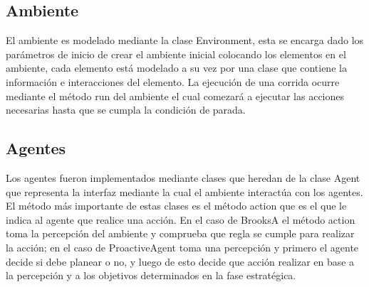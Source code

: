 \documentclass[12pt]{article}
\begin{document}
\subsection{Ambiente}
El ambiente es modelado mediante la clase Environment, esta se encarga dado los par\'ametros de inicio de crear el ambiente 
inicial colocando los elementos en el ambiente, cada elemento est\'a modelado a su vez por una clase que contiene la informaci\'on e interacciones
del elemento. La ejecuci\'on de una corrida ocurre mediante el m\'etodo run del ambiente el cual comezar\'a a ejecutar las acciones necesarias hasta que se cumpla
la condici\'on de parada.
\subsection{Agentes}
Los agentes fueron implementados mediante clases que heredan de la clase Agent que representa la interfaz mediante la cual el ambiente interact\'ua con los
agentes. El m\'etodo m\'as importante de estas clases es el m\'etodo action que es el que le indica al agente que realice una acci\'on. En el caso de BrooksA el m\'etodo action toma 
la percepci\'on del ambiente y comprueba que regla se cumple para realizar la acci\'on; en el caso de ProactiveAgent toma una percepci\'on y primero el agente decide si debe planear o no, y luego de esto decide
que acci\'on realizar en base a la percepci\'on y a los objetivos determinados en la fase estrat\'egica.
\end{document}
